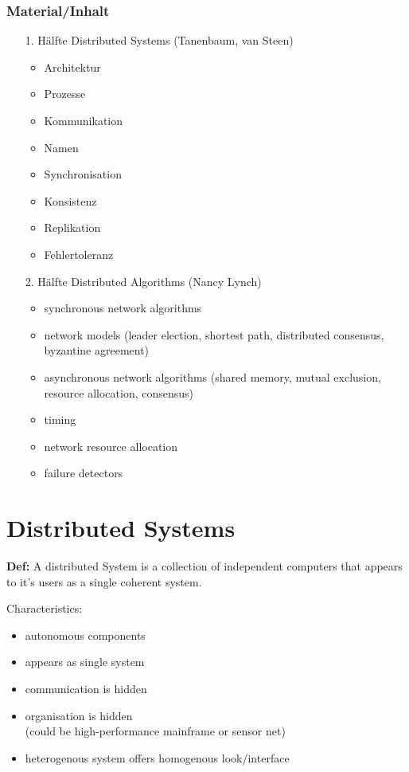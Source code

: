 \documentclass[ngerman,a4paper]{report}
\begin{document}
\subsubsection{Material/Inhalt}
\begin{itemize}
\item[1. Hälfte] Distributed Systems (Tanenbaum, van Steen)
	\begin{itemize}
	\item Architektur
	\item Prozesse
	\item Kommunikation
	\item Namen
	\item Synchronisation
	\item Konsistenz
	\item Replikation
	\item Fehlertoleranz
	\end{itemize}
\item[2. Hälfte] Distributed Algorithms (Nancy Lynch)
	\begin{itemize}
	\item synchronous network algorithms
	\item network models (leader election, shortest path, distributed consensus, byzantine agreement)
	\item asynchronous network algorithms (shared memory, mutual exclusion, resource allocation, consensus)
	\item timing
	\item network resource allocation
	\item failure detectors
	\end{itemize}
\end{itemize}

\section{Distributed Systems}
\textbf{Def:} A distributed System is a collection of independent computers that appears to it's users as a single coherent system.

Characteristics:\\
\begin{itemize}
\item autonomous components
\item appears as single system
\item communication is hidden
\item organisation is hidden \\(could be high-performance mainframe or sensor net)
\item heterogenous system offers homogenous look/interface
\end{itemize}
\end{document}
